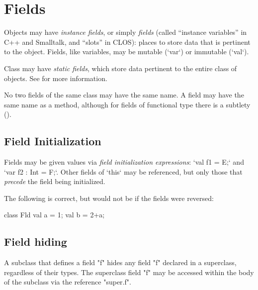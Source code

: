 \section{Fields}
\label{FieldDefinitions}

Objects may have {\em instance fields}, or simply {\em fields} (called
``instance variables'' in C++ and Smalltalk, and ``slots'' in CLOS): places to
store data that is pertinent to the object.  Fields, like variables, may be
mutable (\xcd`var`) or immutable (\xcd`val`).  

Class may have {\em static fields}, which store data pertinent to the
entire class of objects.  
See  for more information.

No two fields of the same class may have the same name.  A field may have the
same name as a method, although for fields of functional type there is a
subtlety ().  

\subsection{Field Initialization}

Fields may be given values via {\em field initialization expressions}:
\xcd`val f1 = E;` and \xcd`var f2 : Int = F;`. Other fields of \xcd`this` may
be referenced, but only those that {\em precede} the field being initialized.


\begin{ex}The following is correct, but would not be if the fields were
reversed:

\begin{xten}
class Fld{
  val a = 1;
  val b = 2+a;
}
\end{xten}
\end{ex}

\subsection{Field hiding}


A subclass that defines a field \xcd"f" hides any field \xcd"f"
declared in a superclass, regardless of their types.  The
superclass field \xcd"f" may be accessed within the body of
the subclass via the reference \xcd"super.f".

